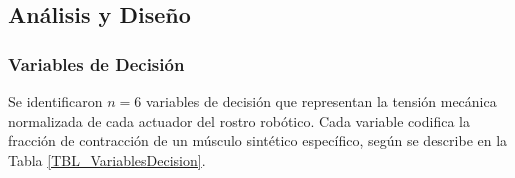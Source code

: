 
\subsection{Análisis y Diseño}


\subsubsection{Variables de Decisión}
\label{PAR_VariablesDecision}
Se identificaron $n = 6$ variables de decisión que representan la tensión mecánica normalizada de cada actuador del rostro robótico. Cada variable codifica la fracción de contracción de un músculo sintético específico, según se describe en la Tabla \ref{TBL_VariablesDecision}.

